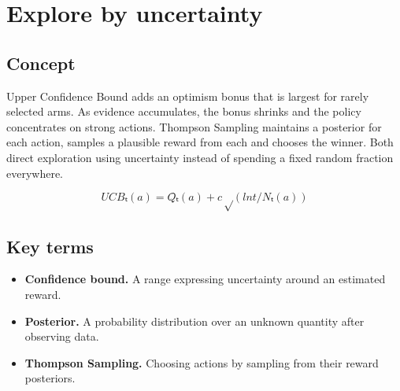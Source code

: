 \section{Explore by uncertainty}

\begin{abstract}
UCB and Thompson Sampling focus exploration where the answer is still uncertain.
\end{abstract}

\subsection{Concept}
Upper Confidence Bound adds an optimism bonus that is largest for rarely selected arms. As evidence accumulates, the bonus shrinks and the policy concentrates on strong actions. Thompson Sampling maintains a posterior for each action, samples a plausible reward from each and chooses the winner. Both direct exploration using uncertainty instead of spending a fixed random fraction everywhere.

\begin{equation*}
UCBₜ(a) = Q̂ₜ(a) + c √(ln t / Nₜ(a))
\end{equation*}

\subsection{Key terms}
\begin{itemize}
\item \textbf{Confidence bound.} A range expressing uncertainty around an estimated reward.
\item \textbf{Posterior.} A probability distribution over an unknown quantity after observing data.
\item \textbf{Thompson Sampling.} Choosing actions by sampling from their reward posteriors.
\end{itemize}
